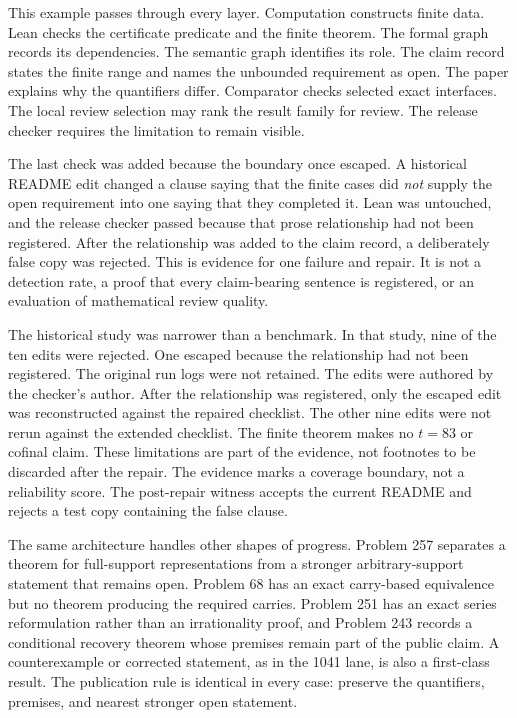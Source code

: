 \documentclass[10pt]{article}
\begin{document}
This example passes through every layer. Computation constructs finite data.
Lean checks the certificate predicate and the finite theorem. The formal graph
records its dependencies. The semantic graph identifies its role. The claim
record states the finite range and names the unbounded requirement as open.
The paper explains why the quantifiers differ. Comparator checks selected exact
interfaces. The local review selection may rank the result family for review. The release checker
requires the limitation to remain visible.

The last check was added because the boundary once escaped. A historical README
edit changed a clause saying that the finite cases did \emph{not} supply the
open requirement into one saying that they completed it. Lean was untouched,
and the release checker passed because that prose relationship had not been
registered. After the relationship was added to the claim record, a deliberately
false copy was rejected. This is evidence for one failure and repair. It is not
a detection rate, a proof that every claim-bearing sentence is registered, or
an evaluation of mathematical review quality.

The historical study was narrower than a benchmark. In that study, nine of the
ten edits were rejected. One escaped because the relationship had not been registered. The
original run logs were not retained. The edits were authored by the checker's
author. After the relationship was registered, only the escaped edit was
reconstructed against the repaired checklist. The other nine edits were not
rerun against the extended checklist. The finite theorem makes no
\(t=83\) or cofinal claim. These limitations are part of the evidence, not
footnotes to be discarded after the repair.
The evidence marks a coverage boundary, not a reliability score.
The post-repair witness accepts the current README and
rejects a test copy containing the false clause.

The same architecture handles other shapes of progress. Problem 257 separates
a theorem for full-support representations from a stronger arbitrary-support
statement that remains open. Problem 68 has an exact carry-based equivalence
but no theorem producing the required carries. Problem 251 has an exact series
reformulation rather than an irrationality proof, and Problem 243 records a
conditional recovery theorem whose premises remain part of the public claim.
A counterexample or corrected statement, as in the 1041 lane, is also a
first-class result. The publication rule is identical in every case: preserve
the quantifiers, premises, and nearest stronger open statement.
\end{document}
